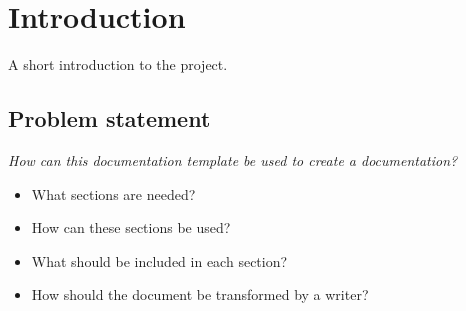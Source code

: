 \section{Introduction}
A short introduction to the project.

\subsection{Problem statement}
\textit{How can this documentation template be used to create a documentation?}
\begin{itemize}
    \item What sections are needed?
    \item How can these sections be used?
    \item What should be included in each section?
    \item How should the document be transformed by a writer?
\end{itemize}